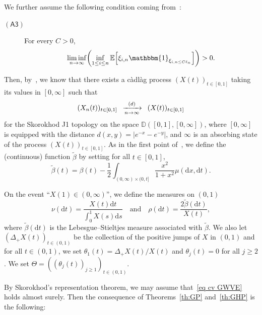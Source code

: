 \documentclass[10pt]{amsart}
\makeatletter
\theoremstyle{definition}\newtheorem{defi}[theo]{Definition}\newtheorem{rema}[theo]{Remark}\newtheorem{exam}[theo]{Example}\newtheorem{exem}[theo]{Example}\newtheorem{nota}[theo]{Notation}
\newcommand{\optionaldesc}[2]{
\phantomsection #1\protected@edef\@currentlabel{#1}\label{#2}
}
\newcommand{\cvloi}[1][n]{\enskip\xrightarrow[#1 \to \infty]{(d)}\enskip}
\newcommand{\rmd}{\mathrm{d}}
\newcommand{\E}{\mathbb{E}}
\newcommand{\1}{\mathbbm{1}}
\let\originalleft\left
\let\originalright\right
\renewcommand{\left}{\mathopen{}\mathclose\bgroup\originalleft}
\renewcommand{\right}{\aftergroup\egroup\originalright}
\renewcommand*{\to}{\mathchoice{\longrightarrow}{\rightarrow}{\rightarrow}{\rightarrow}}
\makeatother
\begin{document}
We further assume the following condition coming from~\cite[Proposition~2.2]{BS15}:
\begin{description}
\item[\textcolor{link}{\optionaldesc{$(\mathsf{A3})$}{hyp:nobottleneck}}] For every $C>0$,
\[
\liminf_{n\to \infty} \left(\inf_{1 \le i \le n }
\E\left[\xi_{i,n} \1_{\xi_{i,n \le C \ell_n}}\right]\right)>0.
\]
\end{description} Then, by~\cite[Theorem~2.1]{BS15}, we know that there exists a càdlàg process $(X(t))_{t\in [0,1]}$ taking its values in $[0,\infty]$ such that
\begin{equation}\label{eq cv GWVE}
(X_n(t))_{t \in [0,1]}\cvloi[n](X(t))_{t\in [0,1]}
\end{equation}
for the Skorokhod J1 topology on the space $\mathbb{D}([0,1], [0,\infty])$, where $[0,\infty]$ is equipped with the distance $d(x,y) = | e^{-x}-e^{-y}|$, and $\infty$ is an absorbing state of the process $(X(t))_{t\in [0,1]}$. As in the first point of~\cite[Theorem~2.1]{BS15}, we define the {(continuous)} function $\widetilde{\beta}$ by setting for all $t \in [0,1]$,
\[
\widetilde{\beta}(t) = \beta(t) - \frac{1}{2} \int_{(0,\infty) \times (0,t]} \frac{x^2}{1+x^2} \mu(\rmd x,\rmd t).
\]

On the event ``$X(1) \in (0,\infty)$'', we define the measures on $(0,1)$
\[
\nu(\rmd t) = \frac{X(t)\rmd t}{\int_0^1 X(s) \rmd s} \quad\text{and}\quad
\rho(\rmd t) = \frac{2\widetilde{\beta}(\rmd t)}{X(t)},
\]
where $\widetilde{\beta}(\rmd t)$ is the Lebesgue--Stieltjes measure associated with $\widetilde{\beta}$. We also let\linebreak $(\Delta_+X(t))_{t \in (0,1)}$ be the collection of the positive jumps of $X$ in $(0,1)$ and for all $t\in (0,1)$, we set $\theta_1(t) = \Delta_+X(t)/X(t)$ and $\theta_j(t)=0$ for all $j\ge 2$. We set $\Theta = ((\theta_j(t))_{j\ge 1})_{t\in (0,1)}$.

By Skorokhod's representation theorem, we may assume that~\eqref{eq cv GWVE} holds almost surely. Then the consequence of Theorems~\ref{th:GP} and~\ref{th:GHP} is the following:
\end{document}
